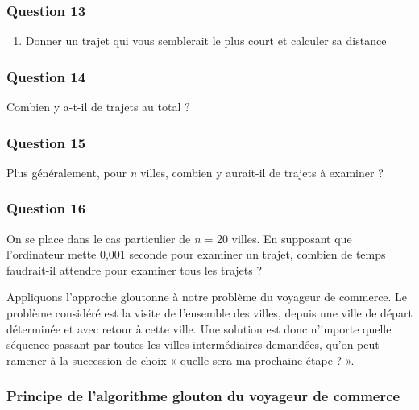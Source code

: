 \documentclass[
  paper=a4,
  ,captions=tableheading
]{scrartcl}
\providecommand{\tightlist}{%
  \setlength{\itemsep}{0pt}\setlength{\parskip}{0pt}}
\begin{document}
\hypertarget{question-13}{%
\subsubsection{Question 13}\label{question-13}}

\begin{enumerate}
\tightlist
\item
  Donner un trajet qui vous semblerait le plus court et calculer sa
  distance
\end{enumerate}

\hypertarget{question-14}{%
\subsubsection{Question 14}\label{question-14}}

Combien y a-t-il de trajets au total ?

\hypertarget{question-15}{%
\subsubsection{Question 15}\label{question-15}}

Plus généralement, pour \emph{n} villes, combien y aurait-il de trajets
à examiner ?

\hypertarget{question-16}{%
\subsubsection{Question 16}\label{question-16}}

On se place dans le cas particulier de \emph{n} = 20 villes. En
supposant que l'ordinateur mette 0,001 seconde pour examiner un trajet,
combien de temps faudrait-il attendre pour examiner tous les trajets ?

Appliquons l'approche gloutonne à notre problème du voyageur de
commerce. Le problème considéré est la visite de l'ensemble des villes,
depuis une ville de départ déterminée et avec retour à cette ville. Une
solution est donc n'importe quelle séquence passant par toutes les
villes intermédiaires demandées, qu'on peut ramener à la succession de
choix « quelle sera ma prochaine étape ? ».

\hypertarget{principe-de-lalgorithme-glouton-du-voyageur-de-commerce}{%
\subsubsection{Principe de l'algorithme glouton du voyageur de
commerce}\label{principe-de-lalgorithme-glouton-du-voyageur-de-commerce}}
\end{document}
